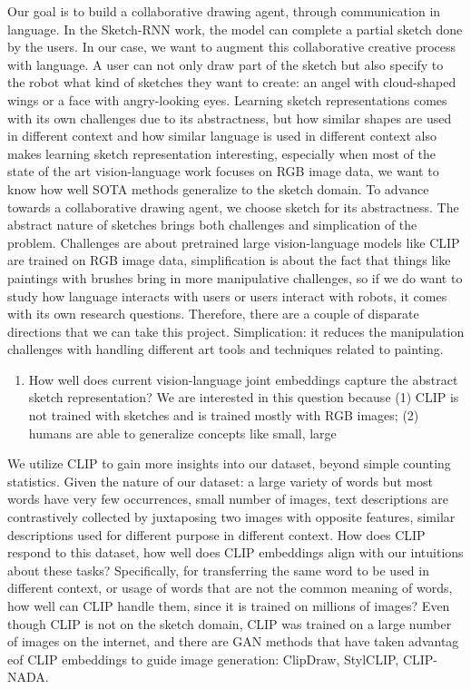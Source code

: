 
Our goal is to build a collaborative drawing agent, through communication in language. In the Sketch-RNN work, the model can complete a partial sketch done by the users. In our case, we want to augment this collaborative creative process with language. A user can not only draw part of the sketch but also specify to the robot what kind of sketches they want to create: an angel with cloud-shaped wings or a face with angry-looking eyes. 
Learning sketch representations comes with its own challenges due to its abstractness, but how similar shapes are used in different context and how similar language is used in different context also makes learning sketch representation interesting, especially when most of the state of the art vision-language work focuses on RGB image data, we want to know how well SOTA methods generalize to the sketch domain. To advance towards a collaborative drawing agent, we choose sketch for its abstractness. 
The abstract nature of sketches brings both challenges and simplication of the problem. Challenges are about pretrained large vision-language models like CLIP are trained on RGB image data, simplification is about the fact that things like paintings with brushes bring in more manipulative challenges, so if we do want to study how language interacts with users or users interact with robots, it comes with its own research questions. Therefore, there are a couple of disparate directions that we can take this project. Simplication: it reduces the manipulation challenges with handling different art tools and techniques related to painting.   
\begin{enumerate}
    \item How well does current vision-language joint embeddings capture the abstract sketch representation? We are interested in this question because (1) CLIP is not trained with sketches and is trained mostly with RGB images; (2) humans are able to generalize concepts like small, large  
\end{enumerate}


We utilize CLIP to gain more insights into our dataset, beyond simple counting statistics. Given the nature of our dataset: a large variety of words but most words have very few occurrences, small number of images, text descriptions are contrastively collected by juxtaposing two images with opposite features, similar descriptions used for different purpose in different context. How does CLIP respond to this dataset, how well does CLIP embeddings align with our intuitions about these tasks? Specifically, for transferring the same word to be used in different context, or usage of words that are not the common meaning of words, how well can CLIP handle them, since it is trained on millions of images? Even though CLIP is not on the sketch domain, CLIP was trained on a large number of images on the internet, and there are GAN methods that have taken advantag eof CLIP embeddings to guide image generation: ClipDraw, StylCLIP, CLIP-NADA.      

